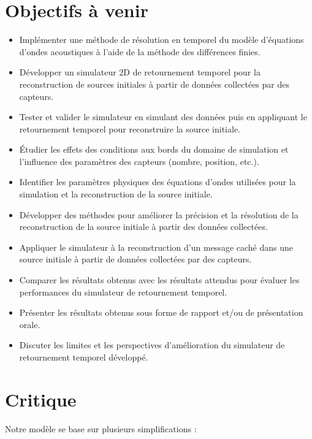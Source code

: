 \documentclass[11pt, a4paper]{article}
\begin{document}
\section{Objectifs à venir}
\begin{itemize}
    \item Implémenter une méthode de résolution en temporel du modèle d'équations d'ondes acoustiques à l'aide de la méthode des différences finies.
    \item Développer un simulateur 2D de retournement temporel pour la reconstruction de sources initiales à partir de données collectées par des capteurs.
    \item Tester et valider le simulateur en simulant des données puis en appliquant le retournement temporel pour reconstruire la source initiale.
    \item Étudier les effets des conditions aux bords du domaine de simulation et l'influence des paramètres des capteurs (nombre, position, etc.).
    \item Identifier les paramètres physiques des équations d'ondes utilisées pour la simulation et la reconstruction de la source initiale.
    \item Développer des méthodes pour améliorer la précision et la résolution de la reconstruction de la source initiale à partir des données collectées.
    \item Appliquer le simulateur à la reconstruction d'un message caché dans une source initiale à partir de données collectées par des capteurs.
    \item Comparer les résultats obtenus avec les résultats attendus pour évaluer les performances du simulateur de retournement temporel.
    \item Présenter les résultats obtenus sous forme de rapport et/ou de présentation orale.
    \item Discuter les limites et les perspectives d'amélioration du simulateur de retournement temporel développé.
\end{itemize}

\section{Critique}

Notre modèle se base sur plusieurs simplifications : 
\end{document}
